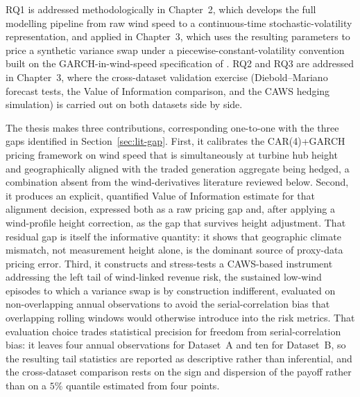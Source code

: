 ﻿\documentclass[11pt, a4paper, twoside]{article}
\begin{document}
RQ1 is addressed methodologically in Chapter~2, which develops the full modelling pipeline from raw wind speed to a continuous-time stochastic-volatility representation, and applied in Chapter~3, which uses the resulting parameters to price a synthetic variance swap under a piecewise-constant-volatility convention built on the GARCH-in-wind-speed specification of \citet{Tol1997}. RQ2 and RQ3 are addressed in Chapter~3, where the cross-dataset validation exercise (Diebold--Mariano forecast tests, the Value of Information comparison, and the CAWS hedging simulation) is carried out on both datasets side by side.

The thesis makes three contributions, corresponding one-to-one with the three gaps identified in Section~\ref{sec:lit-gap}. First, it calibrates the CAR(4)+GARCH pricing framework on wind speed that is simultaneously at turbine hub height and geographically aligned with the traded generation aggregate being hedged, a combination absent from the wind-derivatives literature reviewed below. Second, it produces an explicit, quantified Value of Information estimate for that alignment decision, expressed both as a raw pricing gap and, after applying a wind-profile height correction, as the gap that survives height adjustment. That residual gap is itself the informative quantity: it shows that geographic climate mismatch, not measurement height alone, is the dominant source of proxy-data pricing error. Third, it constructs and stress-tests a CAWS-based instrument addressing the left tail of wind-linked revenue risk, the sustained low-wind episodes to which a variance swap is by construction indifferent, evaluated on non-overlapping annual observations to avoid the serial-correlation bias that overlapping rolling windows would otherwise introduce into the risk metrics. That evaluation choice trades statistical precision for freedom from serial-correlation bias: it leaves four annual observations for Dataset~A and ten for Dataset~B, so the resulting tail statistics are reported as descriptive rather than inferential, and the cross-dataset comparison rests on the sign and dispersion of the payoff rather than on a $5\%$ quantile estimated from four points.
\end{document}
